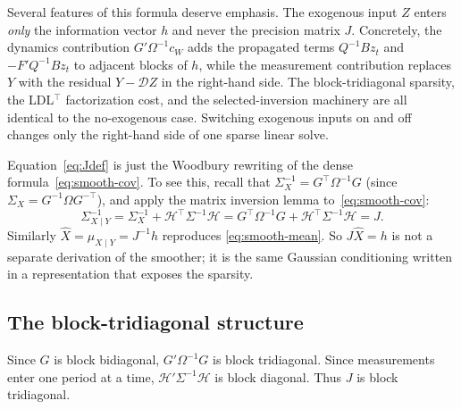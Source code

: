 \documentclass[11pt]{article}
\begin{document}
Several features of this formula deserve emphasis.  The exogenous
input $Z$ enters \emph{only} the information vector $h$ and never
the precision matrix $J$.  Concretely, the dynamics contribution
$G'\Omega^{-1}c_W$ adds the propagated terms $Q^{-1}Bz_t$ and
$-F'Q^{-1}Bz_t$ to adjacent blocks of $h$, while the measurement
contribution replaces $Y$ with the residual $Y-\mathcal DZ$ in the
right-hand side.  The block-tridiagonal sparsity, the LDL$^\top$
factorization cost, and the selected-inversion machinery are all
identical to the no-exogenous case.  Switching exogenous inputs on
and off changes only the right-hand side of one sparse linear solve.

Equation~\eqref{eq:Jdef} is just the Woodbury rewriting of the dense
formula~\eqref{eq:smooth-cov}.  To see this, recall that
$\Sigma_X^{-1}=G^\top\Omega^{-1}G$ (since $\Sigma_X=G^{-1}\Omega G^{-\top}$),
and apply the matrix inversion lemma to~\eqref{eq:smooth-cov}:
\begin{equation}
\Sigma_{X\mid Y}^{-1}=\Sigma_X^{-1}+\mathcal H^\top\Sigma^{-1}\mathcal H
=G^\top\Omega^{-1}G+\mathcal H^\top\Sigma^{-1}\mathcal H=J.
\end{equation}
Similarly $\widehat X=\mu_{X\mid Y}=J^{-1}h$ reproduces
\eqref{eq:smooth-mean}.  So $J\widehat X=h$ is not a separate derivation
of the smoother; it is the same Gaussian conditioning written in a
representation that exposes the sparsity.

\subsection{The block-tridiagonal structure}
\label{sec:tridiag}

Since $G$ is block bidiagonal, $G'\Omega^{-1}G$ is block tridiagonal.
Since measurements enter one period at a time, $\mathcal H'\Sigma^{-1}\mathcal H$
is block diagonal.  Thus $J$ is block tridiagonal.
\end{document}
